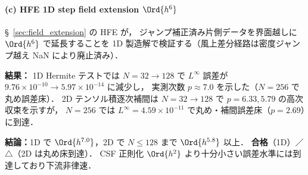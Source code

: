 \paragraph{(c) HFE 1D step field extension $\Ord{h^6}$}
\label{sec:verify_field_extension}
\label{sec:verify_gfm}%

§~\ref{sec:field_extension} の HFE が，
ジャンプ補正済み片側データを界面越しに $\Ord{h^6}$ で延長することを
1D 製造解で検証する（風上差分経路は密度ジャンプ越え NaN により廃止済み）．

\noindent\textbf{結果：}
1D Hermite テストでは $N = 32 \to 128$ で
$L^\infty$ 誤差が $9.76 \times 10^{-10} \to 5.97 \times 10^{-14}$ に減少し，
実測次数 $p \approx 7.0$ を示した（$N = 256$ で丸め誤差床）．
2D テンソル積逐次補間は $N = 32 \to 128$ で $p = 6.33, 5.79$ の高次収束を示すが，
$N = 256$ では $L^\infty = 4.59 \times 10^{-11}$ で丸め・補間誤差床（$p = 2.69$）に到達．

\noindent\textbf{結論：}1D で $\Ord{h^{7.0}}$，2D で $N \leq 128$ まで $\Ord{h^{5.8}}$ 以上．
\textbf{合格}（1D）／ $\triangle$（2D は丸め床到達）．
CSF 正則化 $\Ord{h^2}$ より十分小さい誤差水準には到達しており下流非律速．
